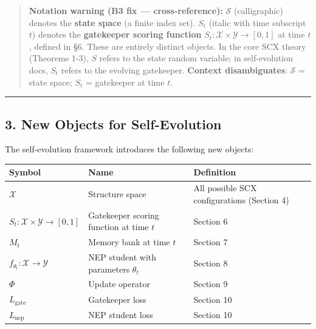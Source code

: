 \documentclass[
  12pt,
]{article}
\begin{document}
\begin{quote}
\textbf{Notation warning (B3 fix --- cross-reference):} \(\mathcal{S}\)
(calligraphic) denotes the \textbf{state space} (a finite index set).
\(S_t\) (italic with time subscript \(t\)) denotes the
\textbf{gatekeeper scoring function}
\(S_t: \mathcal{X} \times \mathcal{Y} \to [0,1]\) at time \(t\), defined
in §6. These are entirely distinct objects. In the core SCX theory
(Theorems 1-3), \(S\) refers to the state random variable; in
self-evolution docs, \(S_t\) refers to the evolving gatekeeper.
\textbf{Context disambiguates}: \(\mathcal{S}\) = state space; \(S_t\) =
gatekeeper at time \(t\).
\end{quote}

\begin{center}\rule{0.5\linewidth}{0.5pt}\end{center}

\subsection{3. New Objects for
Self-Evolution}\label{new-objects-for-self-evolution}

The self-evolution framework introduces the following new objects:

\begin{longtable}[]{@{}
  >{\raggedright\arraybackslash}p{}
  >{\raggedright\arraybackslash}p{}
  >{\raggedright\arraybackslash}p{}@{}}
\toprule\noalign{}
\begin{minipage}[b]{\linewidth}\raggedright
Symbol
\end{minipage} & \begin{minipage}[b]{\linewidth}\raggedright
Name
\end{minipage} & \begin{minipage}[b]{\linewidth}\raggedright
Definition
\end{minipage} \\
\midrule\noalign{}
\endhead
\bottomrule\noalign{}
\endlastfoot
\(\mathcal{X}\) & Structure space & All possible SCX configurations
(Section 4) \\
\(S_t: \mathcal{X} \times \mathcal{Y} \to [0,1]\) & Gatekeeper scoring
function at time \(t\) & Section 6 \\
\(M_t\) & Memory bank at time \(t\) & Section 7 \\
\(f_{\theta_t}: \mathcal{X} \to \mathcal{Y}\) & NEP student with
parameters \(\theta_t\) & Section 8 \\
\(\Phi\) & Update operator & Section 9 \\
\(L_{\text{gate}}\) & Gatekeeper loss & Section 10 \\
\(L_{\text{nep}}\) & NEP student loss & Section 10 \\
\end{longtable}
\end{document}
